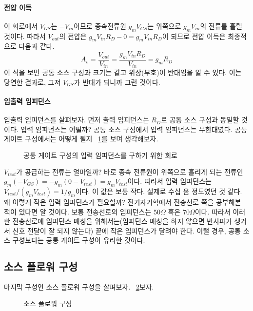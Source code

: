 \paragraph{전압 이득}
이 회로에서 $V_{GS}$는 $-V_{in}$이므로 종속전류원 $g_mV_{GS}$는 위쪽으로 $g_mV_{in}$의 전류를 흘릴 것이다. 따라서 $V_{out}$의 전압은 $g_mV_{in}R_D-0=g_mV_{in}R_D$이 되므로 전압 이득은 최종적으로 다음과 같다.
\begin{equation}
    A_v=\frac{V_{out}}{V_{in}}=\frac{g_mV_{in}R_D}{V_{in}}=g_mR_D
\end{equation}
이 식을 보면 공통 소스 구성과 크기는 같고 위상(부호)이 반대임을 알 수 있다. 이는 당연한 결과로, 그저 $V_{GS}$가 반대가 되니까 그런 것이다.
\paragraph{입출력 임피던스}
입출력 임피던스를 살펴보자. 먼저 출력 임피던스는 $R_D$로 공통 소스 구성과 동일할 것이다. 입력 임피던스는 어떨까? 공통 소스 구성에서 입력 임피던스는 무한대였다. 공통 게이트 구성에서는 어떻게 될지 \figurename~\ref{fig:cg input impedance}를 보며 생각해보자.
\begin{figure}[!tbp]
    \centering
    \caption{공통 게이트 구성의 입력 임피던스를 구하기 위한 회로}\label{fig:cg input impedance}
\end{figure}
$V_{test}$가 공급하는 전류는 얼마일까? 바로 종속 전류원이 위쪽으로 흘리게 되는 전류인 $g_m(-V_{GS})=-g_m(0-V_{test})=g_mV_{test}$이다. 따라서 입력 임피던스는 $V_{test}/(g_mV_{test})=1/g_m$이다.
이 값은 보통 작다. 실제로 수십 옴 정도였던 것 같다. 왜 이렇게 작은 입력 임피던스가 필요할까?
전기자기학에서 전송선로 쪽을 공부해본 적이 있다면 알 것이다. 보통 전송선로의 임피던스는 $50 \Omega $ 혹은 $70 \Omega$이다.
따라서 이러한 전송선로에 임피던스 매칭을 위해서는(임피던스 매칭을 하지 않으면 반사파가 생겨서 신호 전달이 잘 되지 않는다) 끝에 작은 임피던스가 달려야 한다. 이럴 경우, 공통 소스 구성보다는 공통 게이트 구성이 유리한 것이다.

\subsection{소스 폴로워 구성}
마지막 구성인 소스 폴로워 구성을 살펴보자. \figurename~\ref{fig:src follower topology}\를 보자.
\begin{figure}[!hbp]
    \centering
    \caption{소스 폴로워 구성}\label{fig:src follower topology}
\end{figure}
